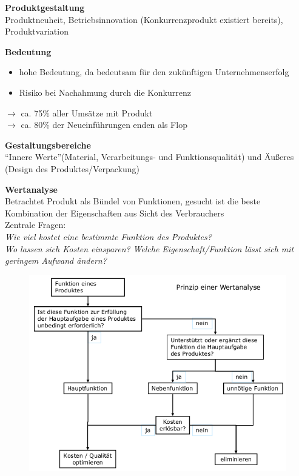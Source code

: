\documentclass[a4paper,11pt, twoside]{article}
\begin{document}
\textbf{Produktgestaltung}\\
Produktneuheit, Betriebsinnovation (Konkurrenzprodukt existiert bereits), Produktvariation

\textbf{Bedeutung}\\
\begin{itemize}
	\item hohe Bedeutung, da bedeutsam für den zukünftigen Unternehmenserfolg
	\item Risiko bei Nachahmung durch die Konkurrenz
\end{itemize}
$\rightarrow$ ca. 75\% aller Umsätze mit Produkt\\
$\rightarrow$ ca. 80\% der Neueinführungen enden als Flop

\textbf{Gestaltungsbereiche}\\
"`Innere Werte"'(Material, Verarbeitungs- und Funktionsqualität) und Äußeres (Design des Produktes/Verpackung)

\textbf{Wertanalyse}\\
Betrachtet Produkt als Bündel von Funktionen, gesucht ist die beste Kombination der Eigenschaften aus Sicht des Verbrauchers\\
Zentrale Fragen:\\
\textit{Wie viel kostet eine bestimmte Funktion des Produktes?}\\
\textit{Wo lassen sich Kosten einsparen?}
\textit{Welche Eigenschaft/Funktion lässt sich mit geringem Aufwand ändern?}
\begin{figure}[h]
 \begin{center}
   \includegraphics[scale=0.3]{bilder/wertanalyse.png}
 \end{center}
\end{figure}
\end{document}
